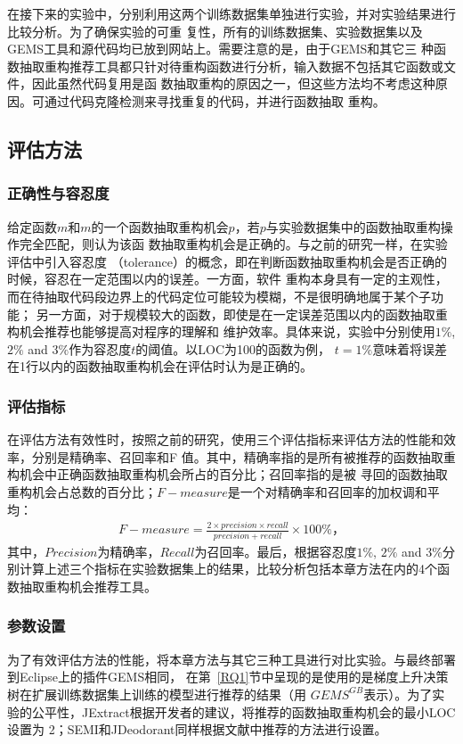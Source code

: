 在接下来的实验中，分别利用这两个训练数据集单独进行实验，并对实验结果进行比较分析。为了确保实验的可重
复性，所有的训练数据集、实验数据集以及GEMS工具和源代码均已放到网站上。需要注意的是，由于GEMS和其它三
种函数抽取重构推荐工具都只针对待重构函数进行分析，输入数据不包括其它函数或文件，因此虽然代码复用是函
数抽取重构的原因之一，但这些方法均不考虑这种原因。可通过代码克隆检测来寻找重复的代码，并进行函数抽取
重构。

\subsection{评估方法}
\subsubsection{正确性与容忍度}\label{tol}
给定函数$m$和$m$的一个函数抽取重构机会$p$，若$p$与实验数据集中的函数抽取重构操作完全匹配，则认为该函
数抽取重构机会是正确的。与之前的研究一样\cite{charalampidou2016identifying}，在实验评估中引入容忍度
（tolerance）的概念，即在判断函数抽取重构机会是否正确的时候，容忍在一定范围以内的误差。一方面，软件
重构本身具有一定的主观性，而在待抽取代码段边界上的代码定位可能较为模糊，不是很明确地属于某个子功能；
另一方面，对于规模较大的函数，即使是在一定误差范围以内的函数抽取重构机会推荐也能够提高对程序的理解和
维护效率。具体来说，实验中分别使用$1\%$, $2\%$ and $3\%$作为容忍度$t$的阈值。以LOC为100的函数为例，
$t=1\%$意味着将误差在1行以内的函数抽取重构机会在评估时认为是正确的。

\subsubsection{评估指标}
在评估方法有效性时，按照之前的研究，使用三个评估指标来评估方法的性能和效率，分别是精确率、召回率和F
值。其中，精确率指的是所有被推荐的函数抽取重构机会中正确函数抽取重构机会所占的百分比；召回率指的是被
寻回的函数抽取重构机会占总数的百分比；$F-measure$是一个对精确率和召回率的加权调和平均：
\begin{eqnarray}
  F-measure = \frac{2 \times precision \times recall}{precision + recall} \times 100\%，
\end{eqnarray}
\label{f1}
其中，$Precision$为精确率，$Recall$为召回率。最后，根据容忍度$1\%$, $2\%$ and $3\%$分别计算上述三个指标在实验数据集上的结果，比较分析包括本章方法在内的4个函数抽取重构机会推荐工具。

\subsubsection{参数设置}\label{canshu}
为了有效评估方法的性能，将本章方法与其它三种工具进行对比实验。与最终部署到Eclipse上的插件GEMS相同，
在第~\ref{RQ1}节中呈现的是使用的是梯度上升决策树在扩展训练数据集上训练的模型进行推荐的结果（用
$GEMS^{GB}$表示）。为了实验的公平性，JExtract根据开发者的建议，将推荐的函数抽取重构机会的最小LOC设置为
2；SEMI和JDeodorant同样根据文献中推荐的方法进行设置。


